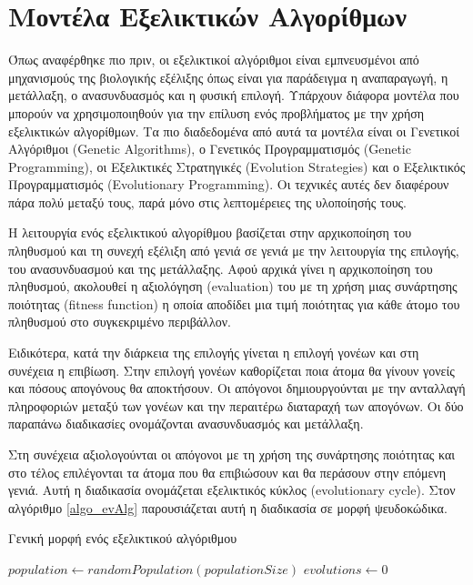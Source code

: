 \section{Μοντέλα Εξελικτικών Αλγορίθμων}
Όπως αναφέρθηκε πιο πριν, οι εξελικτικοί αλγόριθμοι είναι εμπνευσμένοι από μηχανισμούς της βιολογικής εξέλιξης όπως είναι για παράδειγμα η αναπαραγωγή, η μετάλλαξη, ο ανασυνδυασμός και η φυσική επιλογή. \cite{_evolutionary_2014} Υπάρχουν διάφορα μοντέλα που μπορούν να χρησιμοποιηθούν για την επίλυση ενός προβλήματος με την χρήση εξελικτικών αλγορίθμων. Τα πιο διαδεδομένα από αυτά τα μοντέλα είναι οι Γενετικοί Αλγόριθμοι (Genetic Algorithms), ο Γενετικός Προγραμματισμός (Genetic Programming), οι Εξελικτικές Στρατηγικές (Evolution Strategies) και ο Εξελικτικός Προγραμματισμός (Evolutionary Programming). Οι τεχνικές αυτές δεν διαφέρουν πάρα πολύ μεταξύ τους, παρά μόνο στις λεπτομέρειες της υλοποίησής τους. \cite{Adamidis}

Η λειτουργία ενός εξελικτικού αλγορίθμου βασίζεται στην αρχικοποίηση του πληθυσμού και τη συνεχή εξέλιξη από γενιά σε γενιά με την λειτουργία της επιλογής, του ανασυνδυασμού και της μετάλλαξης. Αφού αρχικά γίνει η αρχικοποίηση του πληθυσμού, ακολουθεί η αξιολόγηση (evaluation) του με τη χρήση μιας συνάρτησης ποιότητας (fitness function) η οποία αποδίδει μια τιμή ποιότητας για κάθε άτομο του πληθυσμού στο συγκεκριμένο περιβάλλον.

Ειδικότερα, κατά την διάρκεια της επιλογής γίνεται η επιλογή γονέων και στη συνέχεια η επιβίωση. Στην επιλογή γονέων καθορίζεται ποια άτομα θα γίνουν γονείς και πόσους απογόνους θα αποκτήσουν. Οι απόγονοι δημιουργούνται με την ανταλλαγή πληροφοριών μεταξύ των γονέων και την περαιτέρω διαταραχή των απογόνων. Οι δύο παραπάνω διαδικασίες ονομάζονται ανασυνδυασμός και μετάλλαξη.

Στη συνέχεια αξιολογούνται οι απόγονοι με τη χρήση της συνάρτησης ποιότητας και στο τέλος επιλέγονται τα άτομα που θα επιβιώσουν και θα περάσουν στην επόμενη γενιά. Αυτή η διαδικασία ονομάζεται εξελικτικός κύκλος (evolutionary cycle). Στον αλγόριθμο \ref{algo_evAlg} παρουσιάζεται αυτή η διαδικασία σε μορφή ψευδοκώδικα.

%    

\begin{algorithm}[!t]
    \caption{Γενική μορφή ενός εξελικτικού αλγόριθμου}
    \label{algo_evAlg}
    $population \gets randomPopulation(populationSize)$\;
    $evolutions \gets 0$\;
    \;
\end{algorithm}

